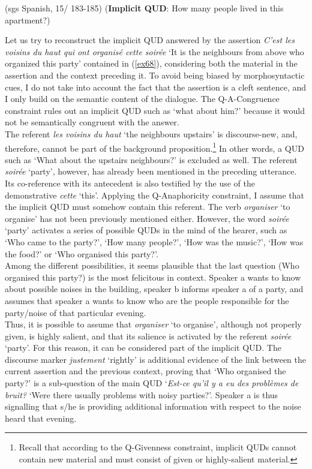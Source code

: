 \begin{description}
\hfill (sgs Spanish, 15/ 183-185)   
\z \z
\hfill (\textbf{Implicit QUD}: How many people lived in this apartment?)


Let us try to reconstruct the implicit QUD answered by the assertion \textit{C'est les voisins du haut qui ont organisé cette soirée} `It is the neighbours from above who organized this party' contained in (\ref{ex68}), considering both the material in the assertion and the context preceding it. To avoid being biased by morphosyntactic cues, I do not take into account  the fact that the assertion is a cleft sentence, and I only build on the semantic content of the dialogue.
The Q-A-Congruence constraint rules out an implicit QUD such as ‘what about him?’ because it would not be semantically congruent with the answer. \\
The referent \textit{les voisins du haut} `the neighbours upstairs' is discourse-new, and, therefore, cannot be part of the background proposition.\footnote{Recall that according to the Q-Givenness constraint, implicit QUDs cannot contain new material and must consist of given or highly-salient material.} In other words, a QUD such as ‘What about the upstairs neighbours?’ is excluded as well. The referent \textit{soirée} `party', however, has already been mentioned in the preceding utterance. Its co-reference with its antecedent is also testified by the use of the demonstrative \textit{cette} `this'. 
Applying the Q-Anaphoricity constraint, I assume that the implicit QUD must somehow contain this referent. 
The verb \textit{organiser} `to organise' has not been previously mentioned either. However, the word \textit{soirée} `party' activates a series of possible QUDs in the mind of the hearer, such as `Who came to the party?', `How many people?', `How was the music?', `How was the food?' or `Who organised this party?'.\\
Among the different possibilities, it seems plausible that the last question (Who organised this party?) is the most felicitous in context. Speaker a wants to know about possible noises in the building, speaker b informs speaker a of a party, and assumes that speaker a wants to know who are the people responsible for the party/noise of that particular evening. \\
Thus, it is possible to assume that \textit{organiser} `to organise', although not properly given, is highly salient, and that its salience is activated by the referent \textit{soirée} `party'. For this reason, it can be considered part of the implicit QUD. The discourse marker \textit{justement} `rightly' is additional evidence of the link between the current assertion and the previous context, proving that ‘Who organised the party?’ is a sub-question of the main QUD ‘\textit{Est-ce qu'il y a eu des problèmes de bruit?} `Were there usually problems with noisy parties?'. Speaker a is thus signalling that s/he is providing additional information with respect to the noise heard that evening.

\end{description}
